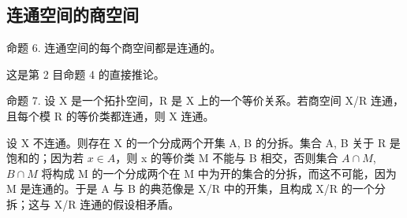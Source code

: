 \subsection{连通空间的商空间}

命题 6. 连通空间的每个商空间都是连通的。

这是第 2 目命题 4 的直接推论。

命题 7. 设 X 是一个拓扑空间，R 是 X 上的一个等价关系。若商空间 X/R 连通，且每个模 R 的等价类都连通，则 X 连通。

设 X 不连通。则存在 X 的一个分成两个开集 A, B 的分拆。集合 A, B 关于 R 是饱和的；因为若 \(x \in A\)，则 x 的等价类 M 不能与 B 相交，否则集合 \(A \cap M\), \(B \cap M\) 将构成 M 的一个分成两个在 M 中为开的集合的分拆，而这不可能，因为 M 是连通的。于是 A 与 B 的典范像是 X/R 中的开集，且构成 X/R 的一个分拆；这与 X/R 连通的假设相矛盾。

